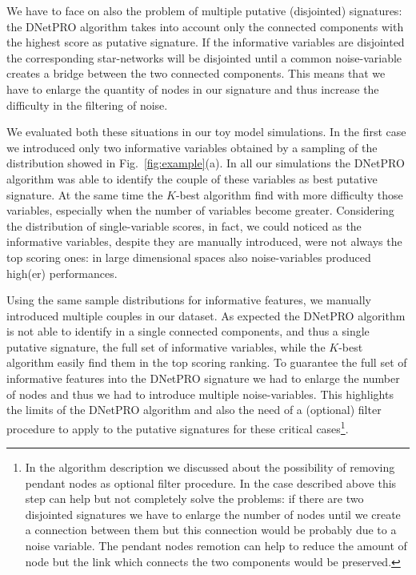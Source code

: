\documentclass{standalone}
\begin{document}
We have to face on also the problem of multiple putative (disjointed) signatures: the DNetPRO algorithm takes into account only the connected components with the highest score as putative signature.
If the informative variables are disjointed the corresponding star-networks will be disjointed until a common noise-variable creates a bridge between the two connected components.
This means that we have to enlarge the quantity of nodes in our signature and thus increase the difficulty in the filtering of noise.

We evaluated both these situations in our toy model simulations.
In the first case we introduced only two informative variables obtained by a sampling of the distribution showed in Fig.~\ref{fig:example}(a).
In all our simulations the DNetPRO algorithm was able to identify the couple of these variables as best putative signature.
At the same time the $K$-best algorithm find with more difficulty those variables, especially when the number of variables become greater.
Considering the distribution of single-variable scores, in fact, we could noticed as the informative variables, despite they are manually introduced, were not always the top scoring ones: in large dimensional spaces also noise-variables produced high(er) performances.

Using the same sample distributions for informative features, we manually introduced multiple couples in our dataset.
As expected the DNetPRO algorithm is not able to identify in a single connected components, and thus a single putative signature, the full set of informative variables, while the $K$-best algorithm easily find them in the top scoring ranking.
To guarantee the full set of informative features into the DNetPRO signature we had to enlarge the number of nodes and thus we had to introduce multiple noise-variables.
This highlights the limits of the DNetPRO algorithm and also the need of a (optional) filter procedure to apply to the putative signatures for these critical cases\footnote{
  In the algorithm description we discussed about the possibility of removing pendant nodes as optional filter procedure.
  In the case described above this step can help but not completely solve the problems: if there are two disjointed signatures we have to enlarge the number of nodes until we create a connection between them but this connection would be probably due to a noise variable.
  The pendant nodes remotion can help to reduce the amount of node but the link which connects the two components would be preserved.
}.

\end{document}
